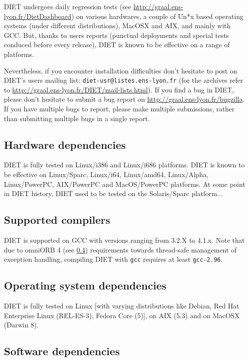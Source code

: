 DIET undergoes daily regression tests
(see \url{http://graal.ens-lyon.fr/DietDashboard})
on various hardwares, a couple of Un*x based operating systems (under
different distributions), MacOSX and AIX, and mainly with GCC.
But, thanks to users reports (punctual deployments and special tests
conduced before every release), DIET is known to be effective on a
range of platforms.

Nevertheless, if you encounter installation difficulties don't hesitate
to post on DIET's users mailing list: \verb+diet-usr@listes.ens-lyon.fr+
(for the archives refer to \url{http://graal.ens-lyon.fr/DIET/mail-lists.html}).
If you find a bug in DIET, please don't hesitate to submit a bug report on
\url{http://graal.ens-lyon.fr/bugzilla}. If you have multiple bugs
to report, please make multiple submissions, rather than submitting
multiple bugs in a single report.

\subsection{Hardware dependencies}
DIET is fully tested on Linux/i386 and Linux/i686 platforms.
DIET is known to be effective on Linux/Sparc, Linux/i64, Linux/amd64,
Linux/Alpha, Linux/PowerPC, AIX/PowerPC and MacOS/PowerPC platforms.
At some point in DIET history, DIET used to be tested on the Solaris/Sparc
platform...

\subsection{Supported compilers}
DIET is supported on GCC with versions ranging from 3.2.X to 4.1.x.
Note that due to omniORB 4 (see \ref{sec:software_dependencies}) requirements
towards thread-safe management of exception handling, compiling DIET with
\verb+gcc+ requires at least \verb+gcc-2.96+.

\subsection{Operating system dependencies}
DIET is fully tested on Linux [with varying distributions like Debian,
Red Hat Enterprise Linux (REL-ES-3), Fedora Core (5)], on AIX (5.3) and on MacOSX
(Darwin 8).

\subsection{Software dependencies}
\label{sec:software_dependencies}

